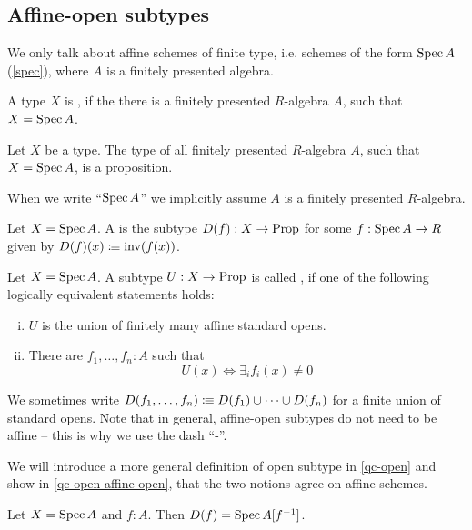 \subsection{Affine-open subtypes}

We only talk about affine schemes of finite type, i.e. schemes of the form $\operatorname{Spec} A$ (\cref{spec}),
where $A$ is a finitely presented algebra.

\begin{definition}%
  A type $X$ is ,
  if the there is a finitely presented $R$-algebra $A$, such that $X=\operatorname{Spec} A$.
\end{definition}

\begin{proposition}%
  Let $X$ be a type.
  The type of all finitely presented $R$-algebra $A$, such that $X=\operatorname{Spec} A$, is a proposition.
\end{proposition}

When we write ``$\operatorname{Spec} A$'' we implicitly assume $A$ is a finitely presented $R$-algebra.

\begin{definition}%
  Let $X=\operatorname{Spec} A$.
  A  is the subtype $D(f):X\to\mathrm{Prop}$
  for some $f:\operatorname{Spec} A\to R$ given by $D(f)(x)\vcentcolon\mspace{-1.2mu}\equiv \mathrm{inv}(f(x))$.
\end{definition}

\begin{definition}%
  \label{affine-open}
  Let $X=\operatorname{Spec} A$.
  A subtype $U:X\to\mathrm{Prop}$ is called ,
  if one of the following logically equivalent statements holds:
  \begin{enumerate}[(i)]%
  \item $U$ is the union of finitely many affine standard opens.
  \item There are $f_1,\dots,f_n:A$ such that
    \[U(x) \Leftrightarrow \exists_{i} f_i(x)\neq 0 \]
  \end{enumerate}
\end{definition}

We sometimes write $D(f_1, \dots, f_n) \vcentcolon\mspace{-1.2mu}\equiv D(f_1) \cup \dots \cup D(f_n)$
for a finite union of standard opens.
Note that in general, affine-open subtypes do not need to be affine
-- this is why we use the dash ``-''.

We will introduce a more general definition of open subtype in \cref{qc-open}
and show in \cref{qc-open-affine-open}, that the two notions agree on affine schemes.

\begin{proposition}
  Let $X = \operatorname{Spec} A$ and $f : A$.
  Then $D(f) = \operatorname{Spec} A[f^{-1}]$.
\end{proposition}

